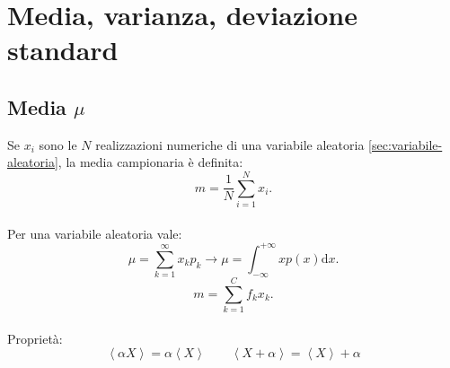 \chapter{Media, varianza, deviazione standard} %
\section{Media $\mu$} %
\label{sec:media}
Se $x_{i}$ sono le $N$ realizzazioni numeriche di una variabile aleatoria \ref{sec:variabile-aleatoria}, la media campionaria è definita:
\begin{equation}
m=\frac { 1 }{ N } \sum _{ i=1 }^{ N }{ { x }_{ i } }.
\end{equation}
\\ Per una variabile aleatoria vale:
\begin{equation}
\mu =\sum _{ k=1 }^{ \infty  }{ { x }_{ k }{ p }_{ k } } \rightarrow \mu =\int _{ -\infty  }^{ +\infty  }{ xp(x)\textrm{d}x }. 
\end{equation}
\begin{equation}
m=\sum _{ k=1 }^{ C }{ { f }_{ k }{ x }_{ k } } .
\end{equation}
\\ Proprietà:
\[
\left< \alpha X \right> =\alpha \left< X \right> \qquad \left< X+\alpha  \right> =\left< X \right> +\alpha 
\]

